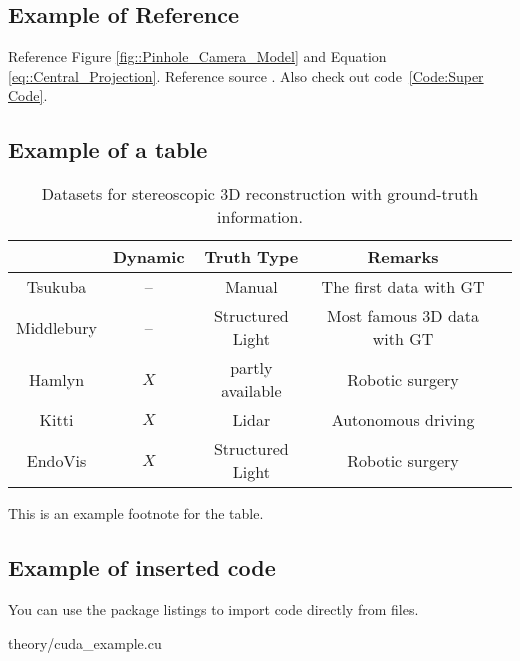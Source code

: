 \documentclass[class=scrbook, crop=false]{standalone}
\begin{document}
    \subsection{Example of Reference}
    Reference Figure \ref{fig::Pinhole_Camera_Model} and Equation \ref{eq::Central_Projection}.
    Reference source \cite{3D_introductorytechniques}. Also check out code~\ref{Code:Super Code}.

    \subsection{Example of a table}
    \begin{table*}[ht]
        \centering
        \caption[Datasets for 3D reconstruction]{Datasets for stereoscopic 3D reconstruction with ground-truth information.}
        \label{Table::Dataset_attributes}
        \begin{tabular}{|c|c|c|c|c|}
            \hline
            ~                        & Dynamic & Truth Type       & Remarks\\
            \hline
            \color{blue} Tsukuba      & --      & Manual           & The first data with GT\\
            \color{orange} Middlebury & --      & Structured Light & Most famous 3D data with GT \\
            \color{red} Hamlyn        & $X$     & partly available & Robotic surgery\\
            \color{cyan} Kitti        & $X$     & Lidar            & Autonomous driving\\
            \color{green} EndoVis     & $X$     & Structured Light & Robotic surgery\\
            \hline
        \end{tabular}
        \begin{tablenotes}
            \small
            \item * This is an example footnote for the table.
        \end{tablenotes}
    \end{table*}

    \subsection{Example of inserted code}
    \label{Section::Insert_Code}
    You can use the package listings to import code directly from files. 
    
    {theory/cuda_example.cu}
\end{document}
